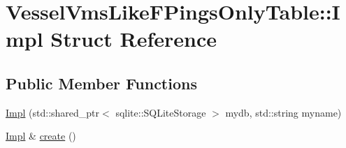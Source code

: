 \hypertarget{struct_vessel_vms_like_f_pings_only_table_1_1_impl}{}\section{Vessel\+Vms\+Like\+F\+Pings\+Only\+Table\+::Impl Struct Reference}
\label{struct_vessel_vms_like_f_pings_only_table_1_1_impl}
\subsection*{Public Member Functions}
\begin{DoxyCompactItemize}
\item 
\mbox{\hyperlink{struct_vessel_vms_like_f_pings_only_table_1_1_impl_a23267685b6c588715bba2dfdafd1aee2}{Impl}} (std\+::shared\+\_\+ptr$<$ sqlite\+::\+S\+Q\+Lite\+Storage $>$ mydb, std\+::string myname)
\item 
\mbox{\hyperlink{struct_vessel_vms_like_f_pings_only_table_1_1_impl}{Impl}} \& \mbox{\hyperlink{struct_vessel_vms_like_f_pings_only_table_1_1_impl_acdcd167cd07f861bf374a4ffa4ab4d11}{create}} ()
\end{DoxyCompactItemize}

